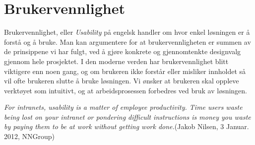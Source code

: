 
\section{\textbf{Brukervennlighet}}
 
 Brukervennlighet, eller \textit{Usability} på engelsk handler om hvor enkel løsningen er å forstå og å bruke. Man kan argumentere for at brukervennligheten er summen av de prinsippene vi har fulgt, ved å gjøre konkrete og gjennomtenkte designvalg gjennom hele prosjektet. I den moderne verden har brukervennlighet blitt viktigere enn noen gang, og om brukeren ikke forstår eller misliker innholdet så vil ofte brukeren slutte å bruke løsningen. Vi ønsker at brukeren skal oppleve verktøyet som intuitivt, og at arbeidsprosessen forbedres ved bruk av løsningen.
     
     
     \textit{For intranets, usability is a matter of employee productivity. Time users waste being lost on your intranet or pondering difficult instructions is money you waste by paying them to be at work without getting work done.}(Jakob Nilsen, 3 Januar. 2012, NNGroup)
     
     
     
     
    
 
